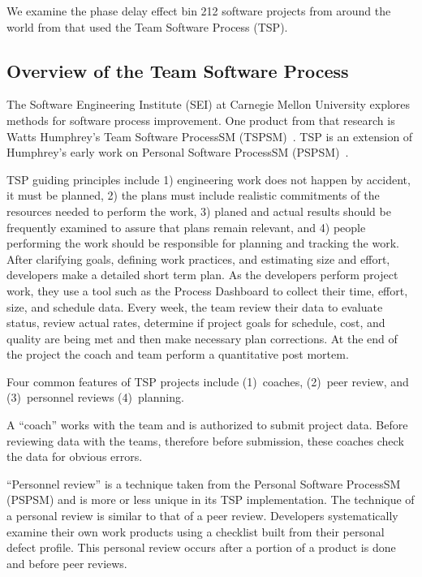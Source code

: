 We examine the phase delay effect bin
212 software projects from around the world from 
 that used the Team Software Process (TSP). 

\subsection{Overview of the Team Software Process}
The Software Engineering Institute (SEI) at
Carnegie Mellon University explores methods for software process improvement.
One product from that research is  
Watts Humphrey's  Team Software ProcessSM (TSPSM)~\cite{tsp00}. TSP is an extension of Humphrey's early
work on Personal Software
ProcessSM (PSPSM)~\cite{psp05}.



TSP guiding principles include 1) engineering work does not happen by accident, it must be planned, 2) the plans must include realistic commitments of the resources needed to perform the work, 3) planed and actual results should be frequently examined to assure that plans remain relevant, and 4) people performing the work should be responsible for planning and tracking the work. After clarifying goals, defining work practices, and estimating size and effort, developers make a detailed short term plan. As the developers perform project work, they use a tool such as the Process Dashboard to collect their time, effort, size, and schedule data. Every week, the team review their data to evaluate status, review actual rates, determine if project goals for schedule, cost, and quality are being met and then make necessary plan corrections. At the end of the project the coach and team perform a quantitative post mortem.

Four common features of TSP projects include (1)~coaches,
(2)~peer review, and  (3)~personnel reviews (4)~planning.
 
A ``coach'' works with the team and is authorized to submit project data.
Before reviewing data with the teams, therefore before submission,
these coaches check the data for obvious errors.

``Personnel review'' is a technique taken  from the Personal Software
ProcessSM (PSPSM) and is more or less unique in its TSP implementation. The technique of a personal review is similar to that of a peer review. Developers systematically examine their own work products using a checklist built from their personal defect profile. This personal review occurs after a portion of a product is done and before peer reviews. 

